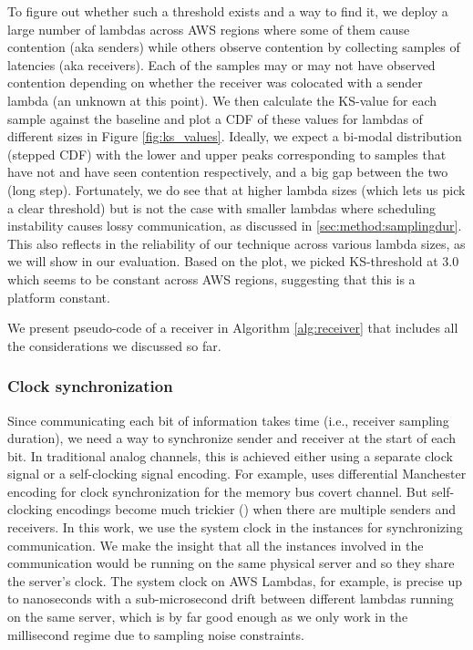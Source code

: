 To figure out whether 
such a threshold exists and a way to find it, we deploy a large number of lambdas 
across AWS regions where some of them cause contention (aka senders) while others 
observe contention by collecting samples of latencies (aka receivers). Each of the 
samples may or may not have observed contention depending on whether the receiver 
was colocated with a sender lambda (an unknown at this point). We then calculate the 
KS-value for each sample against the baseline
and plot a CDF of these values for lambdas of different sizes in Figure \ref{fig:ks_values}.
Ideally, we expect a bi-modal distribution (stepped CDF) with the lower and upper peaks 
corresponding to samples that have not and have seen contention respectively, and a big 
gap between the two (long step). Fortunately, we do see that at higher lambda sizes 
(which lets us pick a clear threshold) but is not the case with smaller lambdas where 
scheduling instability causes lossy communication, as discussed in \ref{sec:method:samplingdur}.
This also reflects in the reliability of our technique across various lambda sizes, as 
we will show in our evaluation. Based on the plot, we picked KS-threshold at 3.0 which 
seems to be constant across AWS regions, suggesting that this is a platform constant.

We present pseudo-code of a receiver in 
Algorithm \ref{alg:receiver} that includes all the 
considerations we discussed so far.

\subsubsection{Clock synchronization} 
Since communicating each bit of information takes time (i.e., receiver sampling 
duration), we need a way to synchronize sender and receiver at the start of 
each bit. In traditional analog channels, this is achieved either using a 
separate clock signal or a self-clocking signal encoding. For example, 
\cite{whispers} uses differential Manchester encoding for clock synchronization 
for the memory bus covert channel.
But self-clocking encodings  become much trickier () when there are 
multiple senders and receivers. In this work, we use the system clock in the instances 
for synchronizing communication. We make the insight that all the instances involved 
in the communication would be running on the same physical server and 
so they share the server's clock. 
The system clock on AWS Lambdas, for example, is precise up to nanoseconds 
with a sub-microsecond drift between different lambdas running on the same server,
which is by far good enough as we only work in the millisecond regime due to 
sampling noise constraints.


